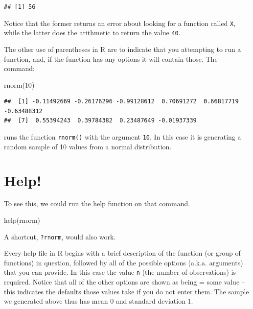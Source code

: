 \documentclass[
]{book}
\newenvironment{Shaded}{\begin{snugshade}}{\end{snugshade}}
\newcommand{\DecValTok}[1]{\textcolor[rgb]{0.00,0.00,0.81}{#1}}
\newcommand{\FunctionTok}[1]{\textcolor[rgb]{0.00,0.00,0.00}{#1}}
\newcommand{\NormalTok}[1]{#1}
\begin{document}
\begin{verbatim}
## [1] 56
\end{verbatim}

Notice that the former returns an error about looking for a function called \texttt{X}, while the latter does the arithmetic to return the value \texttt{40}.

The other use of parentheses in R are to indicate that you attempting to run a function, and, if the function has any options it will contain those. The command:

\begin{Shaded}
\begin{Highlighting}[]
\FunctionTok{rnorm}\NormalTok{(}\DecValTok{10}\NormalTok{)}
\end{Highlighting}
\end{Shaded}

\begin{verbatim}
##  [1] -0.11492669 -0.26176296 -0.99128612  0.70691272  0.66817719 -0.63488312
##  [7]  0.55394243  0.39784382  0.23487649 -0.01937339
\end{verbatim}

runs the function \texttt{rnorm()} with the argument \texttt{10}. In this case it is generating a random sample of 10 values from a normal distribution.

\hypertarget{help}{%
\section{Help!}\label{help}}

To see this, we could run the help function on that command.

\begin{Shaded}
\begin{Highlighting}[]
\FunctionTok{help}\NormalTok{(rnorm)}
\end{Highlighting}
\end{Shaded}

A shortcut, \texttt{?rnorm}, would also work.

Every help file in R begins with a brief description of the function (or group of functions) in question, followed by all of the possible options (a.k.a. arguments) that you can provide. In this case the value \texttt{n} (the number of observations) is required. Notice that all of the other options are shown as being = some value -- this indicates the defaults those values take if you do not enter them. The sample we generated above thus has mean 0 and standard deviation 1.
\end{document}
